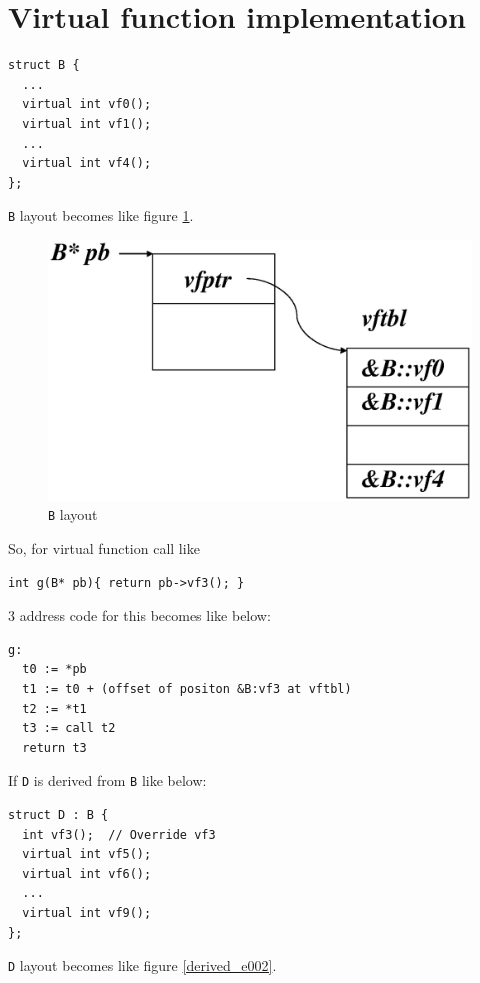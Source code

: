 \documentclass{article}
\begin{document}
\section{Virtual function implementation}

\begin{verbatim}
struct B {
  ...
  virtual int vf0();
  virtual int vf1();
  ...
  virtual int vf4();
};
\end{verbatim}
{\tt {B}} layout becomes like figure \ref{derived_e000}.

\vspace{0.5cm}
\begin{figure}[htbp]
\begin{center}
\includegraphics[width=1.0\linewidth,height=0.6\linewidth]{virtual_function.eps}
\caption{{\tt{B}} layout}
\label{derived_e000}
\end{center}
\end{figure}

So, for virtual function call like
\begin{verbatim}
int g(B* pb){ return pb->vf3(); }
\end{verbatim}
3 address code for this becomes like below:
\begin{verbatim}
g:
  t0 := *pb
  t1 := t0 + (offset of positon &B:vf3 at vftbl)
  t2 := *t1
  t3 := call t2
  return t3
\end{verbatim}

If {\tt{D}} is derived from {\tt{B}} like below:
\begin{verbatim}
struct D : B {
  int vf3();  // Override vf3
  virtual int vf5();
  virtual int vf6();
  ...
  virtual int vf9();
};
\end{verbatim}
{\tt {D}} layout becomes like figure \ref{derived_e002}.
\end{document}
